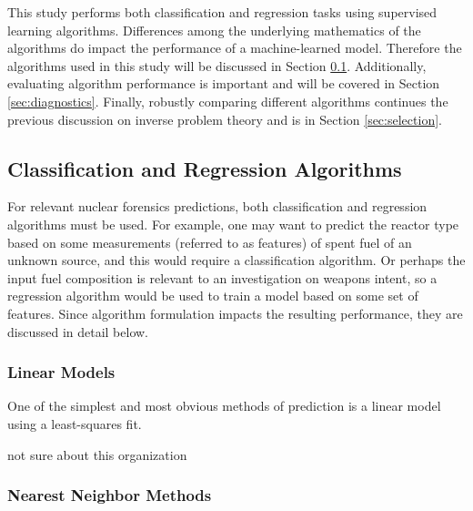 This study performs both classification and regression tasks using supervised
learning algorithms.  Differences among the underlying mathematics  of the algorithms do impact the performance of a machine-learned model.
Therefore the algorithms used in this study will be discussed in
Section \ref{sec:algs}. Additionally, evaluating algorithm performance is 
important and will be covered in Section \ref{sec:diagnostics}. Finally, 
robustly comparing different algorithms continues the previous discussion on 
inverse problem theory and is in Section \ref{sec:selection}.

\subsection{Classification and Regression Algorithms}
\label{sec:algs}

For relevant nuclear forensics predictions, both classification and regression
algorithms must be used.  For example, one may want to predict the reactor type
based on some measurements (referred to as features) of spent fuel of an
unknown source, and this would require a classification algorithm. Or perhaps
the input fuel composition is relevant to an investigation on weapons intent,
so a regression algorithm would be used to train a model based on some set of
features.  Since algorithm formulation impacts the resulting performance, they
are discussed in detail below.  


\subsubsection{Linear Models}
\label{sec:linear}

One of the simplest and most obvious methods of prediction is a linear model using a least-squares 
fit. 





not sure about this organization

\subsubsection{Nearest Neighbor Methods}
\label{sec:neighbor}

